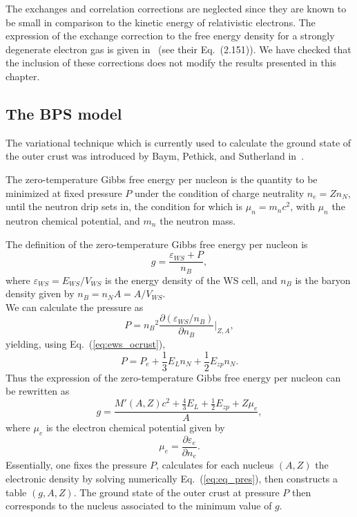 The exchanges and correlation corrections are neglected since they are known 
to be small in comparison to the kinetic energy of relativistic electrons. The 
expression of the exchange correction to the free energy density for a strongly 
degenerate electron gas is given in~\cite{Haensel2007} (see their Eq.~(2.151)).
We have checked that the inclusion of these corrections does not modify the
results presented in this chapter.

\subsection{The BPS model}\label{subsec:bps}

The variational technique which is currently used to calculate the ground state 
of the outer crust was introduced by Baym, Pethick, and Sutherland 
in~\cite{BPS}.

The zero-temperature Gibbs free energy per nucleon is the quantity to be minimized at fixed 
pressure $P$ under the condition of charge neutrality $n_e = Zn_N$, until the 
neutron drip sets in, the condition for which is $\mu_n =
m_n c^2$, with $\mu_n$ the neutron chemical potential, and $m_n$ the neutron
mass.

The definition of the zero-temperature Gibbs free energy per nucleon is
%
\begin{equation}
  g = \frac{\varepsilon_{WS} + P}{n_B},
\end{equation}
%
where $\varepsilon_{WS} = E_{WS}/V_{WS}$ is the energy density of the WS cell, and $n_B$ is the
baryon density given by $n_B = n_NA = A/V_{WS}$.\\
We can calculate the pressure as
%
\begin{equation}
  P = {n_B}^2\frac{\partial (\varepsilon_{WS}/n_B)}{\partial n_B}\Bigr|_{Z,A},
\end{equation}
%
yielding, using Eq.~(\ref{eq:ews_ocrust}),
%
\begin{equation}
  P = P_e + \frac{1}{3}E_Ln_N + \frac{1}{2}E_{zp}n_N.\label{eq:eq_pres}
\end{equation}
%
Thus the expression of the zero-temperature Gibbs free energy per nucleon
can be rewritten as 
%
\begin{equation}
  g = \frac{M'(A,Z)c^2 + \frac{4}{3}E_L + \frac{1}{2}E_{zp} + Z\mu_e}{A},
\end{equation}
%
where $\mu_e$ is the electron chemical potential given by
%
\begin{equation}
  \mu_e = \frac{\partial \varepsilon_e}{\partial n_e}.
\end{equation}
%
Essentially, one fixes the pressure $P$, calculates for each nucleus $(A,Z)$ 
the electronic density by solving numerically Eq.~(\ref{eq:eq_pres}), then
constructs a table $(g,A,Z)$. The ground state of the outer crust at pressure
$P$ then corresponds to the nucleus associated to the minimum value of $g$.

